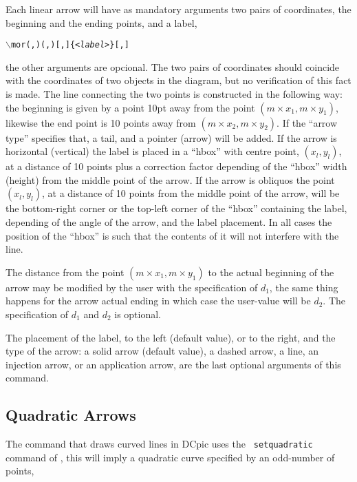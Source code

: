 \documentclass{europroc}
\begin{document}
Each linear arrow will have as mandatory arguments two pairs of
coordinates, the beginning and the ending points, and a label,

{\small\begin{alltt}
\(\backslash\)mor({\em<x1>},{\em<y1>})({\em<x2>},{\em<y2>})[{\em<d1>},{\em<d2>}]\{{\em<label>}\}[{\em<label placement>},{\em<arrow type>}]
\end{alltt}}%
\noindent the other arguments are opcional. The two pairs of coordinates should
coincide with the coordinates of two objects in the diagram, but no
verification of this fact is made. The line connecting the two points
is constructed in the following way: the beginning is given by a point
10pt away from the point $(m\times x_1,m\times y_1)$, likewise the end point is
10 points away from $(m\times x_2,m\times y_2)$. If the ``arrow type'' specifies
that, a tail, and a pointer (arrow) will be added.  If the arrow is
horizontal (vertical) the label is placed in a ``hbox'' with centre
point, $(x_l,y_l)$, at a distance of 10 points plus a correction
factor depending of the ``hbox'' width (height) from the middle point
of the arrow. If the arrow is obliquos the point $(x_l,y_l)$, at a
distance of 10 points from the middle point of the arrow, will be the
bottom-right corner or the top-left corner of the ``hbox'' containing
the label, depending of the angle of the arrow, and the label
placement. In all cases the position of the
``hbox'' is such that the contents of it will not interfere with the
line.

The distance from the point $(m\times x_1,m\times y_1)$ to the actual beginning of the
arrow may be modified by the user with the specification of $d_1$, the
same thing happens for the arrow actual ending in which case the
user-value will be $d_2$. The specification of $d_1$ and $d_2$ is
optional. 

The placement of the label, to the left (default value), or to the
right, and the type of the arrow: a solid arrow (default value), a
dashed arrow, a line, an injection arrow, or an application arrow, are
the last optional arguments of this command.


\subsection{Quadratic Arrows}

The command that draws curved lines in DCpic uses the {\tt
setquadratic} command of \PiCTeX, this will imply a quadratic
curve specified by an odd-number of points,
\end{document}

